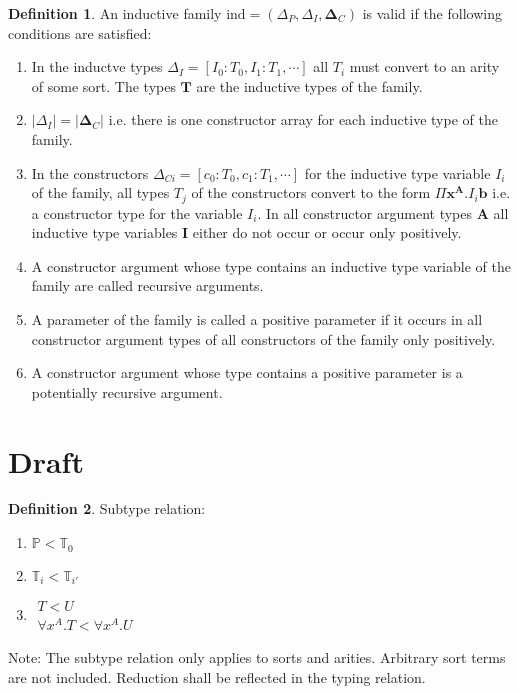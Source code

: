 \documentclass[12pt]{article}
\def\ind{\text{Ind}}
\def\Abold{\mathbf{A}}
\def\bbold{\mathbf{b}}
\def\Ibold{\mathbf{I}}
\def\Tbold{\mathbf{T}}
\def\xbold{\mathbf{x}}
\def\Deltabold{\mathbf{\Delta}}
\def\Prop{\mathbb{P}}
\def\Type{\mathbb{T}}
\def\ind{\text{ind}}
\newcommand{\ruleh}[2]{\begin{array}{c} #1 \\ \hline #2\end{array}}
\theoremstyle{definition} \newtheorem{definition}{Definition}[section]
\theoremstyle{definition} \newtheorem{theorem}[definition]{Theorem}
\theoremstyle{definition} \newtheorem{lemma}[definition]{Lemma}
\begin{document}
\begin{definition}
  An inductive family $\ind = (\Delta_P,\Delta_I,\Deltabold_C)$ is valid if
  the following conditions are satisfied:
  \begin{enumerate}

  \item In the inductve types $\Delta_I = [I_0:T_0,I_1:T_1,\cdots]$ all $T_i$
    must convert to an arity of some sort. The types $\Tbold$ are the
    inductive types of the family.

  \item $|\Delta_I| = |\Deltabold_C|$ i.e. there is one constructor array for
    each inductive type of the family.

  \item In the constructors $\Delta_{Ci} = [c_0:T_0,c_1:T_1,\cdots]$ for the
    inductive type variable $I_i$ of the family, all types $T_j$ of the
    constructors convert to the form $\Pi \xbold^\Abold. I_i\bbold$ i.e. a
    constructor type for the variable $I_i$. In all constructor argument types
    $\Abold$ all inductive type variables $\Ibold$ either do not occur or
    occur only positively.


  \item A constructor argument whose type contains an inductive type variable
    of the family are called recursive arguments.

  \item A parameter of the family is called a positive parameter if it occurs
    in all constructor argument types of all constructors of the family only
    positively.

  \item A constructor argument whose type contains a positive parameter is a
    potentially recursive argument.
  \end{enumerate}
\end{definition}






\section{Draft}

\begin{definition}
  Subtype relation:
  \begin{enumerate}

  \item $\Prop < \Type_0$

  \item $\Type_i < \Type_{i'}$

  \item $\ruleh{T < U}{\forall x^A.T < \forall x^A.U}$
  \end{enumerate}
\end{definition}
Note: The subtype relation only applies to sorts and arities. Arbitrary sort
terms are not included. Reduction shall be reflected in the typing relation.
\end{document}
